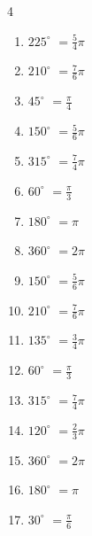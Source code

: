 \begin{multicols}{4}
\begin{enumerate}
  \item $\displaystyle 225^{\circ}$
        $\displaystyle =\frac{5}{4}\pi$

  \item $\displaystyle 210^{\circ}$
        $\displaystyle =\frac{7}{6}\pi$

  \item $\displaystyle 45^{\circ}$
        $\displaystyle =\frac{\pi}{4}$

  \item $\displaystyle 150^{\circ}$
        $\displaystyle =\frac{5}{6}\pi$

  \item $\displaystyle 315^{\circ}$
        $\displaystyle =\frac{7}{4}\pi$

  \item $\displaystyle 60^{\circ}$
        $\displaystyle =\frac{\pi}{3}$

  \item $\displaystyle 180^{\circ}$
        $\displaystyle =\pi$

  \item $\displaystyle 360^{\circ}$
        $\displaystyle =2\pi$

  \item $\displaystyle 150^{\circ}$
        $\displaystyle =\frac{5}{6}\pi$

  \item $\displaystyle 210^{\circ}$
        $\displaystyle =\frac{7}{6}\pi$

  \item $\displaystyle 135^{\circ}$
        $\displaystyle =\frac{3}{4}\pi$

\columnbreak %

  \item $\displaystyle 60^{\circ}$
        $\displaystyle =\frac{\pi}{3}$

  \item $\displaystyle 315^{\circ}$
        $\displaystyle =\frac{7}{4}\pi$

  \item $\displaystyle 120^{\circ}$
        $\displaystyle =\frac{2}{3}\pi$

  \item $\displaystyle 360^{\circ}$
        $\displaystyle =2\pi$

  \item $\displaystyle 180^{\circ}$
        $\displaystyle =\pi$

  \item $\displaystyle 30^{\circ}$
        $\displaystyle =\frac{\pi}{6}$


\end{enumerate}
\end{multicols}
